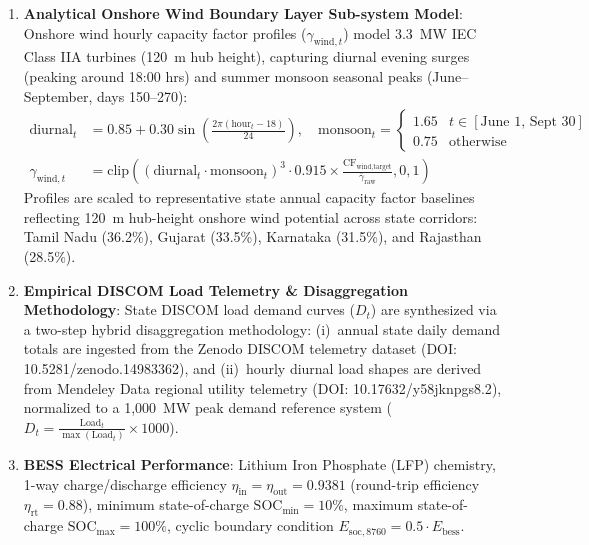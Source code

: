 \documentclass[11pt,a4paper]{article}
\begin{document}
\begin{enumerate}
    \item \textbf{Analytical Onshore Wind Boundary Layer Sub-system Model}: Onshore wind hourly capacity factor profiles ($\gamma_{\text{wind},t}$) model 3.3~MW IEC Class IIA turbines (120~m hub height), capturing diurnal evening surges (peaking around 18:00 hrs) and summer monsoon seasonal peaks (June--September, days 150--270):
    \begin{align}
    \text{diurnal}_t &= 0.85 + 0.30 \sin\left(\frac{2\pi(\text{hour}_t - 18)}{24}\right), \quad \text{monsoon}_t = \begin{cases} 1.65 & t \in [\text{June 1, Sept 30}] \\ 0.75 & \text{otherwise} \end{cases} \label{eq:wind_factors} \\
    \gamma_{\text{wind},t} &= \text{clip}\left( (\text{diurnal}_t \cdot \text{monsoon}_t)^3 \cdot 0.915 \times \frac{\text{CF}_{\text{wind,target}}}{\overline{\gamma}_{\text{raw}}}, 0, 1 \right) \label{eq:wind_prof}
    \end{align}
    Profiles are scaled to representative state annual capacity factor baselines reflecting 120~m hub-height onshore wind potential across state corridors: Tamil Nadu (36.2\%), Gujarat (33.5\%), Karnataka (31.5\%), and Rajasthan (28.5\%).

    \item \textbf{Empirical DISCOM Load Telemetry \& Disaggregation Methodology}: State DISCOM load demand curves ($D_t$) are synthesized via a two-step hybrid disaggregation methodology: (i)~annual state daily demand totals are ingested from the Zenodo DISCOM telemetry dataset (\textsf{DOI: 10.5281/zenodo.14983362}), and (ii)~hourly diurnal load shapes are derived from Mendeley Data regional utility telemetry (\textsf{DOI: 10.17632/y58jknpgs8.2}), normalized to a 1,000~MW peak demand reference system ($D_t = \frac{\text{Load}_t}{\max(\text{Load}_t)} \times 1000$).

    \item \textbf{BESS Electrical Performance}: Lithium Iron Phosphate (LFP) chemistry, 1-way charge/discharge efficiency $\eta_{\text{in}} = \eta_{\text{out}} = 0.9381$ (round-trip efficiency $\eta_{\text{rt}} = 0.88$), minimum state-of-charge $\text{SOC}_{\text{min}} = 10\%$, maximum state-of-charge $\text{SOC}_{\text{max}} = 100\%$, cyclic boundary condition $E_{\text{soc},8760} = 0.5 \cdot E_{\text{bess}}$.
\end{enumerate}

\end{document}
